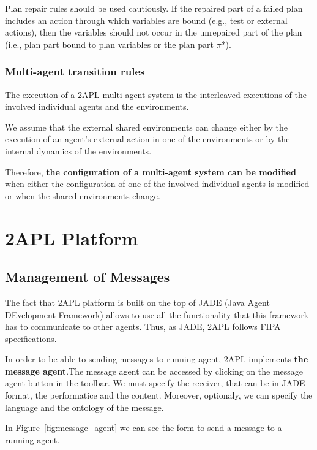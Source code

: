 \documentclass[a4paper]{article}
\begin{document}
Plan repair rules should be used cautiously. If the repaired part of a failed plan includes an action through which variables are bound (e.g., test or external actions), then the variables should not occur in the unrepaired part of the plan (i.e., plan part bound to plan variables or the plan part $\pi$*).


\subsubsection{Multi-agent transition rules}

The execution of a 2APL multi-agent system is the interleaved executions of the involved individual agents and the environments.

We assume that the external shared environments can change either by the execution of an agent's external action in one of the environments or by the internal dynamics of the environments.

Therefore, {\bf the configuration of a multi-agent system can be modified} when either the configuration of one of the involved individual agents is modified or when the shared environments change.

\section{2APL Platform}\label{sec:platform} %

\subsection{Management of Messages}

The fact that 2APL platform is built on the top of JADE (Java Agent DEvelopment Framework) allows to use all the functionality that this framework has to communicate to other agents. Thus, as JADE, 2APL follows FIPA specifications.

In order to be able to sending messages to running agent, 2APL implements {\bf the message agent}.The message agent can be accessed by clicking on the message agent button in the toolbar. We must specify the receiver, that can be in JADE format, the performatice and the content. Moreover, optionaly, we can specify the language and the ontology of the message.

In Figure~\ref{fig:message_agent} we can see the form to send a message to a running agent.
\end{document}
